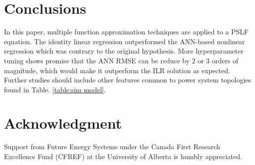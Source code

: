 \documentclass[conference]{IEEEtran}
\begin{document}
\section{Conclusions}
\label{sec:conc}
In this paper, multiple function approximation techniques are applied to a PSLF equation. The identity linear regression outperformed the ANN-based nonlinear regression which was contrary to the original hypothesis. More hyperparameter tuning shows promise that the ANN RMSE can be reduce by 2 or 3 orders of magnitude, which would make it outperform the ILR solution as expected. Further studies should include other features common to power system topologies found in Table. \ref{table:sim model}.

\section*{Acknowledgment}
Support from Future Energy Systems under the Canada First Research Excellence Fund (CFREF) at the University of Alberta is humbly appreciated.




\end{document}
